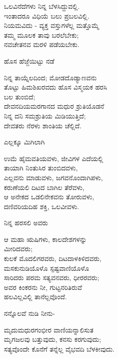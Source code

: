 \begin{myquote}
ಒಲವಿನೆದೆಗಳು ನಿನ್ನ ಬೆಳಸಿದ್ದುವಲ್ಲಿ.\\ಇಂತಾದರೂ ವಿಧಿಯೆ ಬಲು ಪ್ರಬಲವಿಲ್ಲಿ.\\ನಿಯಮವಿದು - ವ್ಯಕ್ತ ವಸ್ತುಗಳೆಲ್ಲ ಮತ್ತೊಮ್ಮೆ\\ತಮ್ಮ ಮೂಲಕ ತಾವು ಬರಲೆಬೇಕು;\\ನವಚೇತನವ ಮರಳಿ ಪಡೆಯಬೇಕು.
\end{myquote}

ಹೊಸ ಹೆಜ್ಜೆಯಿಟ್ಟು ನಡೆ

\begin{myquote}
ನಿನ್ನ ತಾಯ್ನೆಲದಿಂದ; ಮೋಡದೊಡ್ಯಾಣವನು\\ತೊಟ್ಟು ಹಿಮಶಿಖರವದು ಹೊಸ ವಿಸ್ಮಯಕ ಹರಸಿ\\ಬಲ ತುಂಬಿದೆ;\\ದೇವನದಿಯಮರಗಾನದ ಮಧುರ ಶ್ರುತಿಯೊಡನೆ\\ನಿನ್ನ ದನಿ ಸಮಶ್ರುತಿಯ ಮಿಡಿಯುತ್ತಿದೆ;\\ದೇವತರು ನೆರಳು ಶಾಂತಿಯ ಚೆಲ್ಲಿದೆ.
\end{myquote}

ಎಲ್ಲಕ್ಕೂ ಮಿಗಿಲಾಗಿ

\begin{myquote}
ಉಮೆ ಹೈಮವತಿಯವಳು, ಜೀವಿಗಳ ಎದೆಯಲ್ಲಿ\\ತಾಯಾಗಿ ನಿಂತುಸಿರ ತುಂಬಿದವಳು,\\ಎಲ್ಲವನು ಮಾಡುವಳು, ಜಗವನೊಂದಾಗಿಪಳು,\\ಕರುಣೆಯಲಿ ದಿಟದ ಬಾಗಿಲ ತೆರೆವಳು,\\ಆ ಅನೇಕದ ಒಡಲಿನೇಕವನು ತೋರುವಳು,\\ದಣಿವರಿಯದಿಹ ಶಕ್ತಿ, ಒಲವೀವಳು.
\end{myquote}

ನಿನ್ನ ಹರಸಲಿ ಅವರು

\begin{myquote}
ಆ ಮಹಾ ಋಷಿಗಳು, ಕಾಲದೇಶಗಳನ್ನು\\ಮೀರಿದವರು;\\ಕುಲಕೆ ಮೊದಲಿಗರವರು, ದಿಟದಾಳಕಿಳಿದವರು,\\ಮಸಕುನುಡಿಯೊಳೊ ಸ್ಪಷ್ಟವಾಣಿಯೊಳೊ\\ಸಾರಿದರು ಪರಮ ಸತ್ಯವನವರು, ಧೀರರವರು;\\ಅವರ ಕಿಂಕರನು ನೀ, ಗುಟ್ಟನರಿತಿರುವೆ\\ಹಲವಿಲ್ಲವಿಲ್ಲಿ ತಾನೆಲ್ಲವೊಂದೆ.
\end{myquote}

ನನ್ನೊಲವೆ ನುಡಿ ನೀನು-

\begin{myquote}
ಮೃದುಮಧುರಗಂಭೀರ ವಾಣಿಯನ್ನಾಲಿಸುತ\\ಮೃಗಜಲವು ಬತ್ತುವುದು, ಕನಸು ಕರಗುವುದು;\\ಸತ್ಯವೊಂದೇ ಕೊನೆಗೆ ತನ್ನೆಲ್ಲ ವೈಭವದಿ ಬೆಳಕೀವುದು.
\end{myquote}

